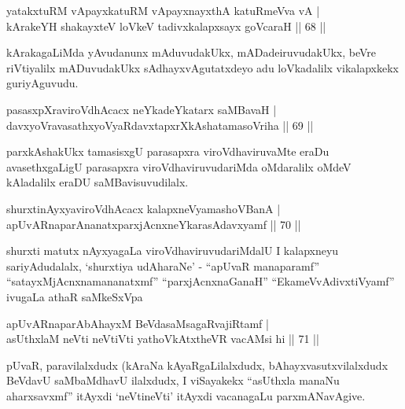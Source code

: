 \begin{shl}
yatakxtuRM vA\s payxkatuRM vA\s payxnayxthA katuRmeVva vA  | \\
kArakeYH shakayxteV loVkeV tadivxkalapxsayx goVcaraH  \hfill||  68 ||  
\end{shl}

\begin{artha}
kArakagaLiMda yAvudanunx mAduvudakUkx, mADadeiruvudakUkx, beVre riVtiyalilx mADuvudakUkx sAdhayxvAgutatxdeyo adu loVkadalilx vikalapxkekx guriyAguvudu.
\end{artha}


\begin{shl}
pasasxpXraviroVdhAcacx neYkadeYkatarx saMBavaH  | \\
davxyoVravasathxyoVyaRdavxtapxrXkAshatamasoVriha \hfill ||  69 ||  
\end{shl}

\begin{artha}
parxkAshakUkx tamasisxgU parasapxra viroVdhaviruvaMte eraDu avasethxgaLigU parasapxra viroVdhaviruvudariMda oMdaralilx oMdeV kAladalilx eraDU saMBavisuvudilalx.
\end{artha}

\begin{shl}
shurxtinAyxyaviroVdhAcacx kalapxneVyamashoVBanA  | \\
apUvARnaparAnanatxparxjAcnxneYkarasAdavxyamf \hfill||  70 ||  
\end{shl}

\begin{artha}
shurxti matutx nAyxyagaLa viroVdhaviruvudariMdalU I kalapxneyu sariyAdudalalx, `shurxtiya udAharaNe' - ``apUvaR manaparamf'' ``satayxMjAcnxnamananatxmf'' ``parxjAcnxnaGanaH'' ``EkameVvAdivxtiVyamf'' ivugaLa athaR saMkeSxVpa \mdash 
\end{artha}

\begin{shl}
apUvARnaparAbAhayxM BeVdasaMsagaRvajiRtamf  | \\
asUthxlaM neVti neVtiVti yathoVkAtxtheVR vacAMsi hi \hfill||  71 ||  
\end{shl}

\begin{artha}
pUvaR, paravilalxdudx (kAraNa kAyaRgaLilalxdudx, bAhayxvasutxvilalxdudx BeVdavU saMbaMdhavU ilalxdudx, I viSayakekx ``asUthxla manaNu aharxsavxmf'' itAyxdi `neVtineVti' itAyxdi vacanagaLu parxmANavAgive.
\end{artha}

